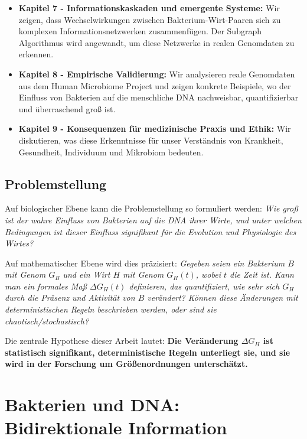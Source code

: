 \documentclass[a4paper,12pt]{article}
\theoremstyle{definition}
\begin{document}
\begin{itemize}
    \item \textbf{Kapitel 7 - Informationskaskaden und emergente Systeme:} Wir zeigen, dass Wechselwirkungen zwischen Bakterium-Wirt-Paaren sich zu komplexen Informationsnetzwerken zusammenfügen. Der Subgraph Algorithmus wird angewandt, um diese Netzwerke in realen Genomdaten zu erkennen.
    
    \item \textbf{Kapitel 8 - Empirische Validierung:} Wir analysieren reale Genomdaten aus dem Human Microbiome Project und zeigen konkrete Beispiele, wo der Einfluss von Bakterien auf die menschliche DNA nachweisbar, quantifizierbar und überraschend groß ist.
    
    \item \textbf{Kapitel 9 - Konsequenzen für medizinische Praxis und Ethik:} Wir diskutieren, was diese Erkenntnisse für unser Verständnis von Krankheit, Gesundheit, Individuum und Mikrobiom bedeuten.
\end{itemize}

\subsection{Problemstellung}

Auf biologischer Ebene kann die Problemstellung so formuliert werden: \textit{Wie groß ist der wahre Einfluss von Bakterien auf die DNA ihrer Wirte, und unter welchen Bedingungen ist dieser Einfluss signifikant für die Evolution und Physiologie des Wirtes?}

Auf mathematischer Ebene wird dies präzisiert: \textit{Gegeben seien ein Bakterium $B$ mit Genom $G_B$ und ein Wirt $H$ mit Genom $G_H(t)$, wobei $t$ die Zeit ist. Kann man ein formales Maß $\Delta G_H(t)$ definieren, das quantifiziert, wie sehr sich $G_H$ durch die Präsenz und Aktivität von $B$ verändert? Können diese Änderungen mit deterministischen Regeln beschrieben werden, oder sind sie chaotisch/stochastisch?}

Die zentrale Hypothese dieser Arbeit lautet: \textbf{Die Veränderung $\Delta G_H$ ist statistisch signifikant, deterministische Regeln unterliegt sie, und sie wird in der Forschung um Größenordnungen unterschätzt.}

\section{Bakterien und DNA: Bidirektionale Information}

\end{document}
